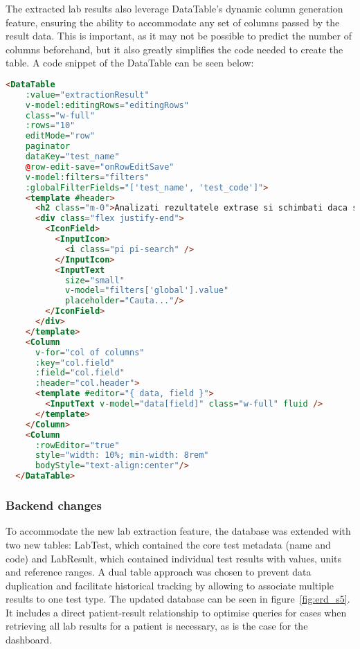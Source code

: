 The extracted lab results also leverage DataTable's dynamic column generation feature, ensuring the ability to accommodate any set of columns passed by the result data. This is important, as it may not be possible to predict the number of columns beforehand, but it also greatly simplifies the code needed to create the table. A code snippet of the DataTable can be seen below:

\begin{lstlisting}[language=HTML, caption=Dynamic DataTable for Lab Results]
  <DataTable
    :value="extractionResult"
    v-model:editingRows="editingRows"
    class="w-full"
    :rows="10"
    editMode="row"
    paginator
    dataKey="test_name"
    @row-edit-save="onRowEditSave"
    v-model:filters="filters"
    :globalFilterFields="['test_name', 'test_code']">
    <template #header>
      <h2 class="m-0">Analizati rezultatele extrase si schimbati daca sunt gresite</h2>
      <div class="flex justify-end">
        <IconField>
          <InputIcon>
            <i class="pi pi-search" />
          </InputIcon>
          <InputText
            size="small"
            v-model="filters['global'].value"
            placeholder="Cauta..."/>
        </IconField>
      </div>
    </template>
    <Column 
      v-for="col of columns" 
      :key="col.field" 
      :field="col.field" 
      :header="col.header">
      <template #editor="{ data, field }">
        <InputText v-model="data[field]" class="w-full" fluid />
      </template>
    </Column>
    <Column
      :rowEditor="true"
      style="width: 10%; min-width: 8rem"
      bodyStyle="text-align:center"/>
  </DataTable>
\end{lstlisting}

\subsubsection{Backend changes}

To accommodate the new lab extraction feature, the database was extended with two new tables: LabTest, which contained the core test metadata (name and code) and LabResult, which contained individual test results with values, units and reference ranges. A dual table approach was chosen to prevent data duplication and facilitate historical tracking by allowing to associate multiple results to one test type. The updated database can be seen in figure~\ref{fig:erd_s5}. It includes a direct patient-result relationship to optimise queries for cases when retrieving all lab results for a patient is necessary, as is the case for the dashboard.

